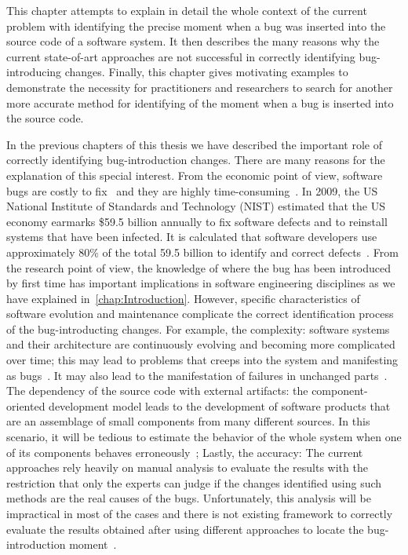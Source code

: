 \documentclass[a4paper, 12pt]{book}
\begin{document}
This chapter attempts to explain in detail the whole context of the current problem with identifying the precise moment when a bug was inserted into the source code of a software system. It then describes the many reasons why the current state-of-art approaches are not successful in correctly identifying bug-introducing changes. Finally, this chapter gives motivating examples to demonstrate the necessity for practitioners and researchers to search for another more accurate method for identifying of the moment when a bug is inserted into the source code.

In the previous chapters of this thesis we have described the important role of correctly identifying bug-introduction changes. There are many reasons for the explanation of this special interest. From the economic point of view, software bugs are costly to fix~\cite{lerner1994software} and they are highly time-consuming~\cite{latoza2006maintaining}. In 2009, the US National Institute of Standards and Technology (NIST) estimated that the US economy earmarks \$59.5 billion annually to fix software defects and to reinstall systems that have been infected. It is calculated that software developers use approximately 80\% of the total 59.5 billion to identify and correct defects~\cite{zhivich2009real}. From the research point of view, the knowledge of where the bug has been introduced by first time has important implications in software engineering disciplines as we have explained in~\ref{chap:Introduction}. However, specific characteristics of software evolution and maintenance complicate the correct identification process of the bug-introducting changes. For example, the complexity: software systems and their architecture are continuously evolving and becoming more complicated over time; this may lead to problems  that creeps into the system and manifesting as bugs~\cite{le2016architectural}. It may also lead to the manifestation of failures in unchanged parts~\cite{german2009change}.  The dependency of the source code with external artifacts: the component-oriented development model leads to the development of software products that are an assemblage of small components from many different sources. In this scenario, it will be tedious to estimate the behavior of the whole system when one of its components behaves erroneously~\cite{duraes2006emulation}; Lastly, the accuracy: The current approaches rely heavily on manual analysis to evaluate the results with the restriction that only the experts can judge if the changes identified using such methods are the real causes of the bugs. Unfortunately, this analysis will be impractical in most of the cases and there is not existing framework to correctly evaluate the results obtained after using different approaches to locate the bug-introduction moment~\cite{da2016framework}.
\end{document}
